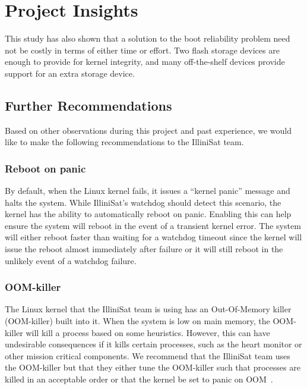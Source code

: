 \section{Project Insights}\label{sec:insights}

This study has also shown that a solution to the boot reliability problem need not be costly in terms of either time or effort.  Two flash storage devices are enough to provide for kernel integrity, and many off-the-shelf devices provide support for an extra storage device.

\subsection{Further Recommendations}
Based on other observations during this project and past experience, we would
like to make the following recommendations to the IlliniSat team.

\subsubsection{Reboot on panic} By default, when the Linux kernel fails, it
issues a ``kernel panic'' message and halts the system.  While IlliniSat's
watchdog should detect this scenario, the kernel has the ability to
automatically reboot on panic.  Enabling this can help ensure the system will
reboot in the event of a transient kernel error. The system will either reboot
faster than waiting for a watchdog timeout since the kernel will issue the
reboot almost immediately after failure or it will still reboot in the unlikely
event of a watchdog failure.

\subsubsection{OOM-killer} The Linux kernel that the IlliniSat team is using
has an Out-Of-Memory killer (OOM-killer) built into it. When the system is 
low on main memory, the OOM-killer will kill a process based on some heuristics.
However, this can have undesirable consequences if it kills certain processes, such
as the heart monitor or other mission critical components. We recommend that the
IlliniSat team uses the OOM-killer but that they either tune the OOM-killer such 
that processes are killed in an acceptable order or that the kernel be set
to panic on OOM~\cite{oracleoom}.


